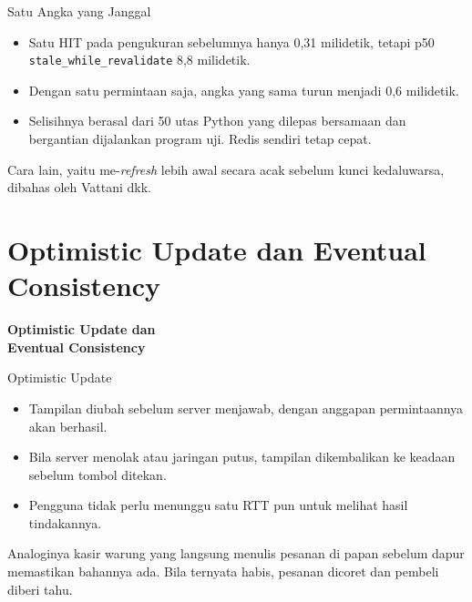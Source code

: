 \documentclass[aspectratio=169, table, 12pt]{beamer}
\begin{document}
\begin{frame}{{\Large Satu Angka yang Janggal}}
  \vspace{10pt}
  \begin{itemize}
    \item Satu HIT pada pengukuran sebelumnya hanya 0,31 milidetik, tetapi p50
          \texttt{stale\_while\_revalidate} 8,8 milidetik.
    \item Dengan satu permintaan saja, angka yang sama turun menjadi 0,6
          milidetik.
    \item Selisihnya berasal dari 50 utas Python yang dilepas bersamaan dan
          bergantian dijalankan program uji. Redis sendiri tetap cepat.
  \end{itemize}
  \vspace{8pt}
  {\footnotesize Cara lain, yaitu me-\textit{refresh} lebih awal secara acak sebelum
  kunci kedaluwarsa, dibahas oleh Vattani dkk.}
\end{frame}

\section{Optimistic Update dan Eventual Consistency}

\begin{frame}{\hfill}
  \centering
  \Huge{\textbf{Optimistic Update dan\\Eventual Consistency}}
\end{frame}

\begin{frame}{{\Large Optimistic Update}}
  \vspace{10pt}
  \begin{itemize}
    \item Tampilan diubah sebelum server menjawab, dengan anggapan
          permintaannya akan berhasil.
    \item Bila server menolak atau jaringan putus, tampilan dikembalikan ke
          keadaan sebelum tombol ditekan.
    \item Pengguna tidak perlu menunggu satu RTT pun untuk melihat hasil
          tindakannya.
  \end{itemize}
  \vspace{8pt}
  {\footnotesize Analoginya kasir warung yang langsung menulis pesanan di papan
  sebelum dapur memastikan bahannya ada. Bila ternyata habis, pesanan dicoret
  dan pembeli diberi tahu.}
\end{frame}
\end{document}
